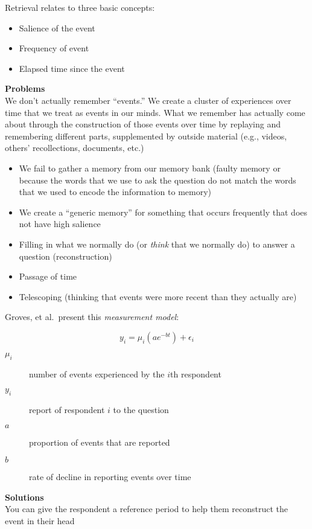 \documentclass[11pt]{lecturenotes}
\begin{document}
Retrieval relates to three basic concepts: 
\begin{itemize}
\item Salience of the event 
\item Frequency of event 
\item Elapsed time since the event
\end{itemize}

\textbf{Problems}\\
We don't actually remember ``events.'' We create a cluster of experiences over time that we treat as events in our minds. What we remember has actually come about through the construction of those events over time by replaying and remembering different parts, supplemented by outside material (e.g., videos, others' recollections, documents, etc.)

\begin{itemize}
\item We fail to gather a memory from our memory bank (faulty memory or because the words that we use to ask the question do not match the words that we used to encode the information to memory)
\item We create a ``generic memory'' for something that occurs frequently that does not have high salience
\item Filling in what we normally do (or \emph{think} that we normally do) to answer a question (reconstruction)
\item Passage of time
\item Telescoping (thinking that events were more recent than they actually are)
\end{itemize}


Groves, et al.\ present this \emph{measurement model}:

\[y_i = \mu_i\left(ae^{-bt}\right) + \epsilon_i \]

\begin{description}
\item[$\mu_i$] number of events experienced by the $i$th respondent
\item[$y_i$] report of respondent $i$ to the question
\item[$a$] proportion of events that are reported
\item[$b$] rate of decline in reporting events over time
\end{description}

\textbf{Solutions}\\
You can give the respondent a reference period to help them reconstruct the event in their head 
\end{document}
